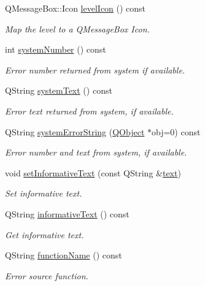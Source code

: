 \begin{DoxyCompactItemize}
Q\-Message\-Box\-::\-Icon \hyperlink{classmdt_error_aac5a7cec9a5d4364f9331c80e1eafe99}{level\-Icon} () const 
\begin{DoxyCompactList}\small\item\em Map the level to a Q\-Message\-Box Icon. \end{DoxyCompactList}\item 
int \hyperlink{classmdt_error_a1be3f45cd56b3142f50c288df9f53204}{system\-Number} () const 
\begin{DoxyCompactList}\small\item\em Error number returned from system if available. \end{DoxyCompactList}\item 
Q\-String \hyperlink{classmdt_error_a6cd449e657f321b86d234269b5e92cda}{system\-Text} () const 
\begin{DoxyCompactList}\small\item\em Error text returned from system, if available. \end{DoxyCompactList}\item 
Q\-String \hyperlink{classmdt_error_a28d22c0b9341faacfef22a7deae2da3c}{system\-Error\-String} (\hyperlink{class_q_object}{Q\-Object} $\ast$obj=0) const 
\begin{DoxyCompactList}\small\item\em Error number and text from system, if available. \end{DoxyCompactList}\item 
void \hyperlink{classmdt_error_a8ef108a0502df7875f1b54bbb2a8919d}{set\-Informative\-Text} (const Q\-String \&\hyperlink{classmdt_error_a8630bb6b21b70edfe3d13eaff82a1baf}{text})
\begin{DoxyCompactList}\small\item\em Set informative text. \end{DoxyCompactList}\item 
Q\-String \hyperlink{classmdt_error_adcc1905f585c327cec8a2e31af616651}{informative\-Text} () const 
\begin{DoxyCompactList}\small\item\em Get informative text. \end{DoxyCompactList}\item 
Q\-String \hyperlink{classmdt_error_abff9bc71ff554f6f6189be88b0afa731}{function\-Name} () const 
\begin{DoxyCompactList}\small\item\em Error source function. \end{DoxyCompactList}\item 

\end{DoxyCompactItemize}
